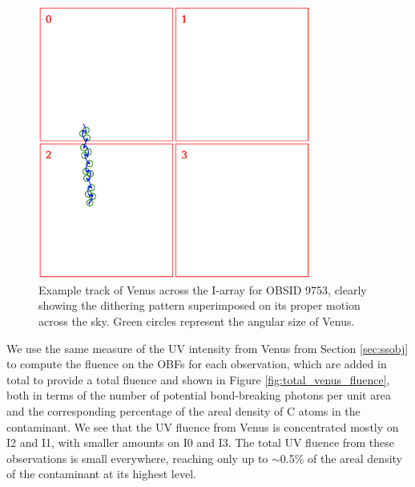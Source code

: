 \documentclass[11pt]{article}
\begin{document}
\begin{figure}
\begin{center}
\includegraphics[width=0.8\textwidth]{venus_track.eps}
\caption{Example track of Venus across the I-array for OBSID 9753, clearly showing the dithering pattern superimposed
on its proper motion across the sky. Green circles represent the angular size of Venus.\label{fig:venus_track}}
\end{center}
\end{figure}

We use the same measure of the UV intensity from Venus from Section \ref{sec:ssobj} to compute the fluence on the OBFs
for each observation, which are added in total to provide a total fluence and shown in Figure \ref{fig:total_venus_fluence},
both in terms of the number of potential bond-breaking photons per unit area and the corresponding percentage of the areal
density of C atoms in the contaminant. We see that the UV fluence from Venus is concentrated mostly on I2 and I1, with
smaller amounts on I0 and I3. The total UV fluence from these observations is small everywhere, reaching only up to
$\sim$0.5\% of the areal density of the contaminant at its highest level.
\end{document}
